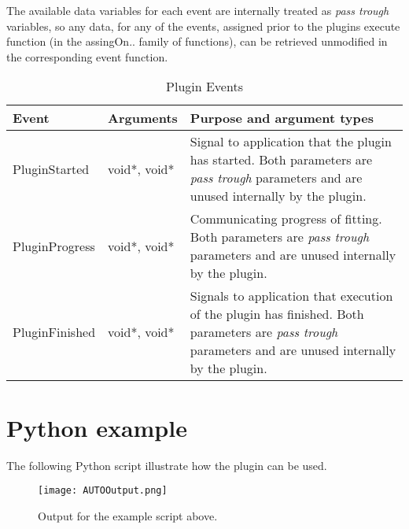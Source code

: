 The available data variables for each event are internally treated as \emph{pass trough} variables, so any data, for any of the events, assigned prior to 
the plugins execute function (in the assingOn.. family of functions), can be retrieved unmodified in the corresponding event function.

\begin{table}[ht]
\centering %
\begin{tabular}{l l p{9cm}} 

Event & Arguments & Purpose and argument types \\ [0.5ex] %
\hline %
PluginStarted  	& 	void*, void*  & Signal to application that the plugin has started. Both parameters are \emph{pass trough} parameters and are unused internally by the plugin.\\[0.5ex]
PluginProgress	& 	void*, void*  & Communicating progress of fitting. Both parameters are \emph{pass trough} parameters and are unused internally by the plugin. \\[0.5ex]
PluginFinished	& 	void*, void*  & Signals to application that execution of the plugin has finished. Both parameters are \emph{pass trough} parameters and are unused internally by the plugin.\\

\hline %
\end{tabular}
\caption{Plugin Events} 
\label{table:autoPluginEvents} 
\end{table}

\section{Python example}
The following Python script illustrate how the plugin can be used. 

\begin{singlespace}

\end{singlespace}

\begin{figure}
\centering
\texttt{[image: AUTOOutput.png]}
\caption{Output for the example script above.}
\label{fig:nmFig}
\end{figure}






